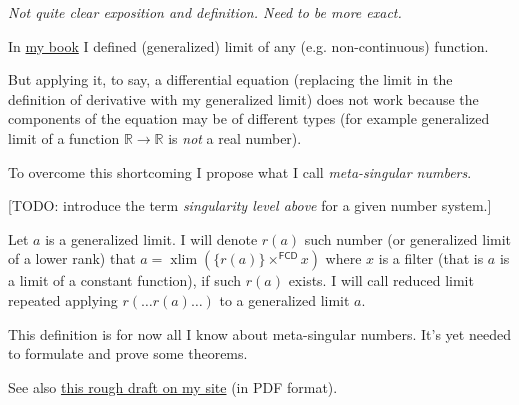 \documentclass[12pt]{article}
\begin{document}
{\em Not quite clear exposition and definition. Need to be more exact.}

In \href{http://www.mathematics21.org/algebraic-general-topology.html}{my book} I defined (generalized) limit of any (e.g. non-continuous) function.

But applying it, to say, a differential equation (replacing the limit in the definition of derivative with my generalized limit) does not work because the components of the equation may be of different types (for example generalized limit of a function $\mathbb{R}\rightarrow \mathbb{R}$ is \emph{not} a real number).

To overcome this shortcoming I propose what I call \emph{meta-singular numbers}.

[TODO: introduce the term \emph{singularity level above} for a given number system.]

Let $a$ is a generalized limit. I will denote $r(a)$ such number (or generalized limit of a lower rank) that $a = \operatorname{xlim}(\{r(a)\}\times^{\mathsf{FCD}} x)$ where $x$ is a filter (that is $a$ is a limit of a constant function), if such $r(a)$ exists. I will call reduced limit repeated applying $r(\dots r(a)\dots)$ to a generalized limit $a$.

This definition is for now all I know about meta-singular numbers. It's yet needed to formulate and prove some theorems.

See also \href{http://www.mathematics21.org/binaries/reduced-limit.pdf}{this rough draft on my site} (in PDF format).
\end{document}
